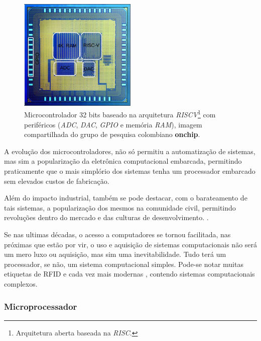 \begin{figure}[!htb]
  \centering
  \caption[Microcontrolador na pastilha de silício.]{Microcontrolador 32 bits baseado na arquitetura \textit{RISCV}\footnote{Arquitetura aberta baseada na \textit{RISC}.}
  com periféricos (\textit{ADC}, \textit{DAC}, \textit{GPIO} e memória \textit{RAM}), imagem compartilhada do grupo de pesquisa
  colombiano \textbf{onchip}.}
  \label{fig:ricv}
  \includegraphics[width=0.5\textwidth]{figuras/riscv.jpg}
\end{figure}


A evolução dos microcontroladores, não só permitiu a automatização de sistemas, mas sim a popularização da eletrônica
computacional embarcada, permitindo praticamente que o mais simplório dos sistemas tenha um processador embarcado sem
elevados custos de fabricação.

Além do impacto industrial, também se pode destacar, com o barateamento de tais sistemas, a popularização dos mesmos na
comunidade civil, permitindo revoluções dentro do mercado e das culturas de desenvolvimento. .

Se nas ultimas décadas, o acesso a computadores se tornou facilitada, nas próximas que estão por vir, o uso e aquisição de sistemas computacionais não será um mero luxo ou aquisição, mas sim uma inevitabilidade. Tudo terá um processador, se não, um sistema computacional simples. Pode-se notar muitas etiquetas de RFID e cada vez mais modernas \cite{ricci2008design}, contendo sistemas computacionais complexos.

\subsubsection{Microprocessador}

